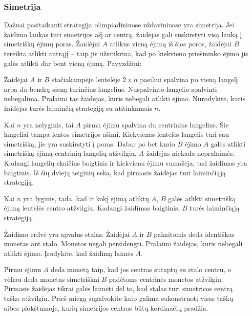 \subsubsection{Simetrija}

Dažnai pasitaikanti strategija olimpiadiniuose uždaviniuose yra simetrija.
Jei žaidimo laukas turi simetrijos ašį ar centrą, žaidėjas gali suskirstyti
visą lauką į simetriškų ėjimų poras. Žaidėjui $A$ atlikus vieną ėjimą iš šios
poros, žaidėjui $B$ tereikia atlikti antrąjį -- taip jis užsitikrina, kad po
kiekvieno priešininko ėjimo jis galės atlikti dar bent vieną ėjimą.
Pavyzdžiui:

\begin{pavnr}
  Žaidėjai $A$ ir $B$ stačiakampėje lentelėje $ 2\times n$ paeiliui spalvina po
  vieną langelį arba du bendrą sieną turinčius langelius. Nuspalvinto
  langelio spalvinti nebegalima. Pralaimi tas žaidėjas, kuris nebegali
  atlikti ėjimo. Nurodykite, kuris žaidėjas turės laiminčią strategiją su
  atitinkamais $n$. 
\end{pavnr}

\begin{sprendimas}
  Kai $n$ yra nelyginis, tai $A$ pirmu ėjimu spalvina du centrinius
  langelius. Šie langeliai tampa lentos simetrijos ašimi. Kiekvienas lentelės
  langelis turi sau simetrišką, jie yra suskirstyti į poras. Dabar po bet
  kurio $B$ ėjimo $A$ galės atlikti simetrišką ėjimą centrinių langelių
  atžvilgiu. $A$ žaidėjas niekada nepralaimės. Kadangi langelių skaičius
  baigtinis ir kiekvienu ėjimu sumažėja, tad žaidimas yra baigtinis. Iš šių
  dviejų teiginių seka, kad pirmasis žaidėjas turi laiminčiąją strategiją. 

  Kai $n$ yra lyginis, tada, kad ir kokį ėjimą atliktų $A$, $B$ galės atlikti
  simetrišką ėjimą lentelės centro atžvilgiu. Kadangi žaidimas baigtinis,
  $B$ turės laiminčiąją strategiją. 
\end{sprendimas}

\begin{pavnr}
  Žaidimo erdvė yra apvalus stalas. Žaidėjai $A$ ir $B$ pakaitomis deda
  identiškas monetas ant stalo. Monetos negali persidengti. Pralaimi
  žaidėjas, kuris nebegali atlikti ėjimo. Įrodykite, kad žaidimą laimės $A$. 
\end{pavnr}

\begin{sprendimas}
Pirmu ėjimu $A$ deda monetą taip, kad jos centras sutaptų su stalo centru, o
vėliau deda monetas simetriškai $B$ padėtoms centrinės monetos atžvilgiu. Pirmasis žaidėjas tikrai galės laimėti
dėl to, kad stalas turi simetricos centrą taško atžvilgiu. Prieš miegą sugalvokite kaip galima sukonstruoti visas taškų aibes plokštumoje, kurių simetrijos centras būtų kordinačių pradžia.    
\end{sprendimas}


